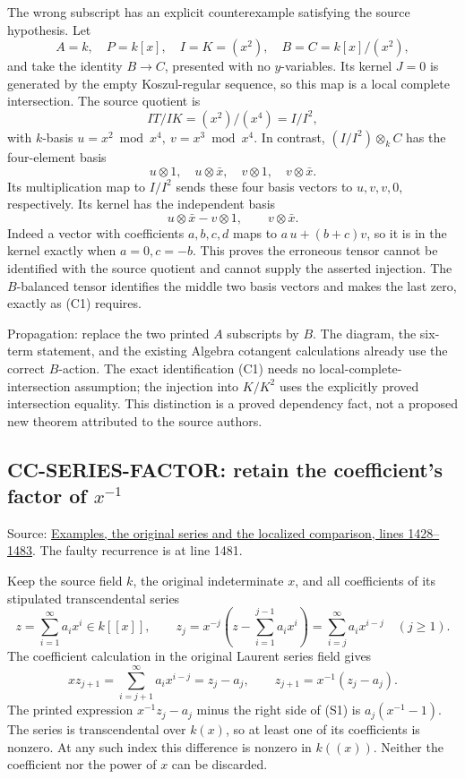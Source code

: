 \documentclass[11pt]{article}
\begin{document}
The wrong subscript has an explicit counterexample satisfying the source hypothesis. Let \[
 A=k,\quad P=k[x],\quad I=K=(x^2),\quad
 B=C=k[x]/(x^2),
\] and take the identity \(B\to C\), presented with no \(y\)-variables. Its kernel \(J=0\) is generated by the empty Koszul-regular sequence, so this map is a local complete intersection. The source quotient is \[
 IT/IK=(x^2)/(x^4)=I/I^2,
\] with \(k\)-basis \(u=x^2\bmod x^4,\ v=x^3\bmod x^4\). In contrast, \((I/I^2)\otimes_k C\) has the four-element basis \[
 u\otimes1,\quad u\otimes\bar x,\quad v\otimes1,\quad
 v\otimes\bar x.
\] Its multiplication map to \(I/I^2\) sends these four basis vectors to \(u,v,v,0\), respectively. Its kernel has the independent basis \[
 u\otimes\bar x-v\otimes1,\qquad v\otimes\bar x.
\] Indeed a vector with coefficients \(a,b,c,d\) maps to \(a\,u+(b+c)v\), so it is in the kernel exactly when \(a=0,c=-b\). This proves the erroneous tensor cannot be identified with the source quotient and cannot supply the asserted injection. The \(B\)-balanced tensor identifies the middle two basis vectors and makes the last zero, exactly as (C1) requires.

Propagation: replace the two printed \(A\) subscripts by \(B\). The diagram, the six-term statement, and the existing Algebra cotangent calculations already use the correct \(B\)-action. The exact identification (C1) needs no local-complete-intersection assumption; the injection into \(K/K^2\) uses the explicitly proved intersection equality. This distinction is a proved dependency fact, not a proposed new theorem attributed to the source authors.

\subsection{\texorpdfstring{CC-SERIES-FACTOR: retain the coefficient's factor of \(x^{-1}\)}{CC-SERIES-FACTOR: retain the coefficient's factor of x\^{}\{-1\}}}\label{cc-series-factor-retain-the-coefficients-factor-of-x-1}

Source: \href{https://github.com/stacks/stacks-project/blob/a04446e5\allowbreak{}7ec1fbc2\allowbreak{}52a871af\allowbreak{}cec7752f\allowbreak{}b2807b14/examples.tex\#L1428}{Examples, the original series and the localized comparison, lines 1428--1483}. The faulty recurrence is at line 1481.

Keep the source field \(k\), the original indeterminate \(x\), and all coefficients of its stipulated transcendental series \[
 z=\sum_{i=1}^{\infty}a_i x^i\in k[[x]],\qquad
 z_j=x^{-j}\left(z-\sum_{i=1}^{j-1}a_i x^i\right)
     =\sum_{i=j}^{\infty}a_i x^{i-j}\quad(j\geq1).
\] The coefficient calculation in the original Laurent series field gives \[
 xz_{j+1}
 =\sum_{i=j+1}^{\infty}a_i x^{i-j}
 =z_j-a_j,\qquad
 z_{j+1}=x^{-1}(z_j-a_j).
\tag{S1}
\] The printed expression \(x^{-1}z_j-a_j\) minus the right side of (S1) is \(a_j(x^{-1}-1)\). The series is transcendental over \(k(x)\), so at least one of its coefficients is nonzero. At any such index this difference is nonzero in \(k((x))\). Neither the coefficient nor the power of \(x\) can be discarded.
\end{document}

